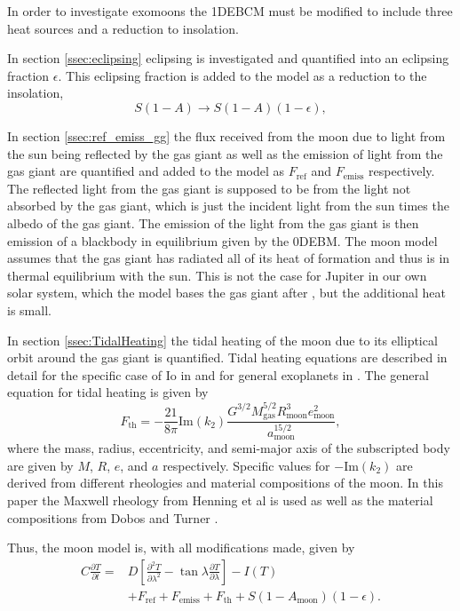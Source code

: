 \documentclass[12pt, onecolumn]{revtex4-2}    %
\newcommand{\partialderiv}[2]{\frac{\partial {#1}}{\partial {#2}}}
\newcommand{\partialderivsecnd}[2]{\frac{\partial^2 {#1}}{\partial {#2}^2}}
\begin{document}
In order to investigate exomoons the 1DEBCM must be modified to include three heat sources and a reduction to insolation.

In section \ref{ssec:eclipsing} eclipsing is investigated and quantified into an eclipsing fraction $\epsilon$.
This eclipsing fraction is added to the model as a reduction to the insolation,
\begin{equation}
  S(1-A) \to S(1-A)(1-\epsilon),
  \label{eq:reduction_insolation}
\end{equation}

In section \ref{ssec:ref_emiss_gg} the flux received from the moon due to light from the sun being reflected by the gas giant as well as the emission of light from the gas giant are quantified and added to the model as $F_\text{ref}$ and $F_\text{emiss}$ respectively.
The reflected light from the gas giant is supposed to be from the light not absorbed by the gas giant, which is just the incident light from the sun times the albedo of the gas giant.
The emission of the light from the gas giant is then emission of a blackbody in equilibrium given by the 0DEBM.
The moon model assumes that the gas giant has radiated all of its heat of formation and thus is in thermal equilibrium with the sun.
This is not the case for Jupiter in our own solar system, which the model bases the gas giant after \cite{LJW2018}, but the additional heat is small.

In section \ref{ssec:TidalHeating} the tidal heating of the moon due to its elliptical orbit around the gas giant is quantified.
Tidal heating equations are described in detail for the specific case of Io in \cite{YP1981, Segatz1988} and for general exoplanets in \cite{DobosTurner2015, DHT2017}.
The general equation for tidal heating is given by
\begin{equation}
  F_\text{th} = -\frac{21}{8\pi} \text{Im}(k_2) \frac{G^{3/2} M_\text{gas}^{5/2} R_\text{moon}^{3} e_\text{moon}^2}{a_\text{moon}^{15/2}},
  \label{eq:tidalheating_flux}
\end{equation}
where the mass, radius, eccentricity, and semi-major axis of the subscripted body are given by $M$, $R$, $e$, and $a$ respectively.
Specific values for $-\text{Im}(k_2)$ are derived from different rheologies and material compositions of the moon.
In this paper the Maxwell rheology from Henning et al \cite{Henning2009} is used as well as the material compositions from Dobos and Turner \cite{DobosTurner2015}.

Thus, the moon model is, with all modifications made, given by
\begin{equation}
  \begin{split}
    C \partialderiv{T}{t} =& D\left[\partialderivsecnd{T}{\lambda} - \tan\lambda\partialderiv{T}{\lambda}\right] - I(T) \\
    & + F_\text{ref} + F_\text{emiss} + F_\text{th} + S(1-A_\text{moon})(1-\epsilon).
  \end{split}
  \label{eq:1DEBCM_moon}
\end{equation}
\end{document}
